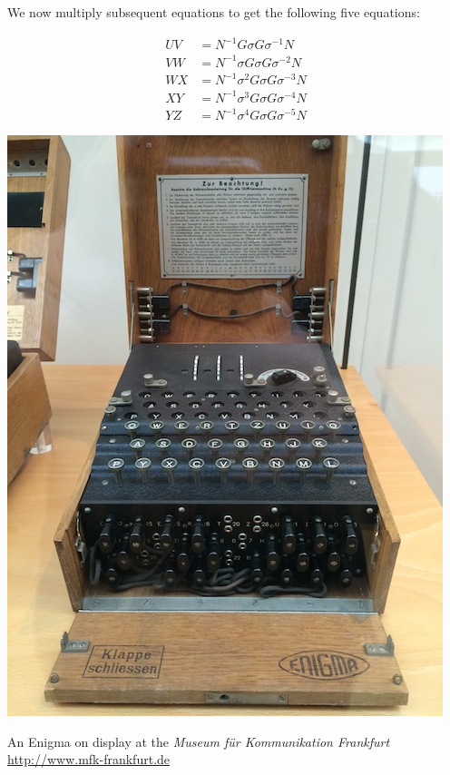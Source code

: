 We now multiply subsequent equations to get the following five equations:

\begin{equation} \label{sixEnigma4}
\begin{split}
U V &= N^{-1} G \sigma G \sigma^{-1} N \\
V W &= N^{-1} \sigma G \sigma G \sigma^{-2} N \\
W X &= N^{-1} \sigma^{2} G \sigma G \sigma^{-3} N \\
X Y &= N^{-1} \sigma^{3} G \sigma G \sigma^{-4} N \\
Y Z &= N^{-1} \sigma^{4} G \sigma G \sigma^{-5} N
\end{split}
\end{equation}

\begin{marginfigure}[0.0in]
\includegraphics[scale=0.3]{enigmaFrankfurt.jpg}
\caption{An Enigma on display at the \textit{Museum f\"ur Kommunikation Frankfurt} \url{http://www.mfk-frankfurt.de}}
\end{marginfigure}

